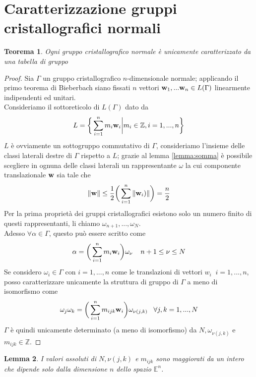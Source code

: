 \documentclass[a4paper,11pt,openright,twoside	]{book}
\newtheorem{theorem}{Teorema}[section]
\newtheorem{lemma}[theorem]{Lemma}
\begin{document}
\section{Caratterizzazione gruppi cristallografici normali}
\begin{theorem}
\label{teo:caratnorm}
Ogni gruppo cristallografico normale è unicamente caratterizzato da una tabella di gruppo 
\end{theorem}
\begin{proof}
Sia $\Gamma$ un gruppo cristallografico $n$-dimensionale normale;	 applicando il primo teorema di Bieberbach siano fissati $n$ vettori $\vb{w}_1, ... \vb{w}_n \in L(\Gamma) $ linearmente indipendenti ed unitari. \\
Consideriamo il sottoreticolo  di $L(\Gamma)$ dato da 
\[ L = \bigg\{ \sum_{i = 1}^{n} m_i \vb{w}_i \bigg| m_i \in \mathbb{Z}, i = 1, ..., n \bigg\} \]
$L$ è ovviamente un sottogruppo commutativo di $\Gamma$, consideriamo l'insieme delle classi laterali destre di $ \Gamma$ rispetto a $L$; grazie al lemma \ref{lemma:somma} è possibile scegliere in ognuna delle classi laterali un rappresentante $\omega$ la cui componente translazionale $\vb{w} $ sia tale che 
\[ \norm{\vb{w}} \leq \frac{1}{2} \bigg( \sum_{i = 1}^{n} \norm{ \vb{w}_i)} \bigg) = \frac{n}{2}\]  
Per la prima proprietà dei gruppi cristallografici esistono solo un numero finito di questi rappresentanti, li chiamo $\omega_{n+1}, ... , \omega_N$. \\
Adesso $\forall \alpha \in \Gamma$, questo può essere scritto come 
\[ \alpha = \bigg( \sum_{i = 1}^{n} m_i \vb{w}_i \bigg) \omega_{\nu} \; \; \; \; n+1 \leq \nu \leq N\]
Se considero $\omega_i \in \Gamma$ con $i=1, ...,n$ come le translazioni di vettori $w_i \; \; i=1, ...,n$, posso caratterizzare unicamente la struttura di gruppo di $\Gamma$ a meno di isomorfismo come 
\begin{equation} \label{eq:1}
	 \omega_j \omega_k = \bigg( \sum_{i = 1}^{n} m_{ijk} \vb{w}_i\bigg) \omega_{\nu (j,k)}      \; \; \; \forall j,k =1, ...,N 
\end{equation}
$\Gamma$  è quindi unicamente determinato (a meno di isomorfismo) da $N, \omega_{\nu (j,k)}$ e $m_{ijk} \in \mathbb{Z}$.
\end{proof}
\begin{lemma}
\label{lemma:valass}
I valori assoluti di $N, \nu (j,k)$  e $m_{ijk}$ sono maggiorati da un intero che dipende solo dalla dimensione $n$ dello spazio $\mathbb{E}^n$.
\end{lemma}
\end{document}
